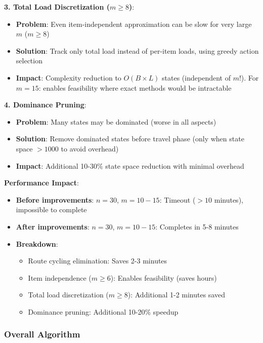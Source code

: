 \documentclass[12pt]{article}
\begin{document}
\textbf{3. Total Load Discretization ($m \geq 8$)}:
\begin{itemize}
    \item \textbf{Problem}: Even item-independent approximation can be slow for very large $m$ ($m \geq 8$)
    \item \textbf{Solution}: Track only total load instead of per-item loads, using greedy action selection
    \item \textbf{Impact}: Complexity reduction to $O(B \times L)$ states (independent of $m$!). For $m=15$: enables feasibility where exact methods would be intractable
\end{itemize}

\textbf{4. Dominance Pruning}:
\begin{itemize}
    \item \textbf{Problem}: Many states may be dominated (worse in all aspects)
    \item \textbf{Solution}: Remove dominated states before travel phase (only when state space $> 1000$ to avoid overhead)
    \item \textbf{Impact}: Additional 10-30\% state space reduction with minimal overhead
\end{itemize}

\textbf{Performance Impact}:
\begin{itemize}
    \item \textbf{Before improvements}: $n=30$, $m=10-15$: Timeout ($>10$ minutes), impossible to complete
    \item \textbf{After improvements}: $n=30$, $m=10-15$: Completes in 5-8 minutes
    \item \textbf{Breakdown}:
    \begin{itemize}
        \item Route cycling elimination: Saves 2-3 minutes
        \item Item independence ($m \geq 6$): Enables feasibility (saves hours)
        \item Total load discretization ($m \geq 8$): Additional 1-2 minutes saved
        \item Dominance pruning: Additional 10-20\% speedup
    \end{itemize}
\end{itemize}

\subsubsection{Overall Algorithm}
\end{document}
